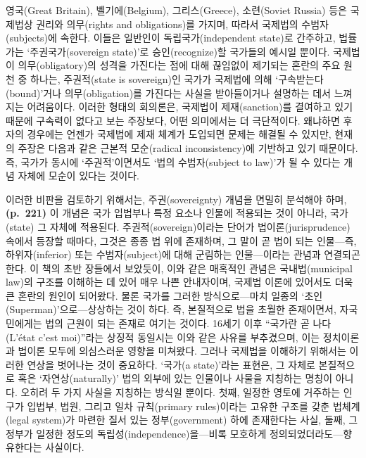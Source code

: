 영국(Great Britain), 벨기에(Belgium), 그리스(Greece), 소련(Soviet
Russia) 등은 국제법상 권리와 의무(rights and obligations)를 가지며,
따라서 국제법의 수범자(subjects)에 속한다. 이들은 일반인이
독립국가(independent state)로 간주하고, 법률가는 `주권국가(sovereign
state)'로 승인(recognize)할 국가들의 예시일 뿐이다. 국제법이
의무(obligatory)의 성격을 가진다는 점에 대해 끊임없이 제기되는 혼란의
주요 원천 중 하나는, 주권적(state is sovereign)인 국가가 국제법에 의해
`구속받는다(bound)'거나 의무(obligation)를 가진다는 사실을 받아들이거나
설명하는 데서 느껴지는 어려움이다. 이러한 형태의 회의론은, 국제법이
제재(sanction)를 결여하고 있기 때문에 구속력이 없다고 보는 주장보다,
어떤 의미에서는 더 극단적이다. 왜냐하면 후자의 경우에는 언젠가 국제법에
제재 체계가 도입되면 문제는 해결될 수 있지만, 현재의 주장은 다음과 같은
근본적 모순(radical inconsistency)에 기반하고 있기 때문이다. 즉, 국가가
동시에 `주권적'이면서도 `법의 수범자(subject to law)'가 될 수 있다는
개념 자체에 모순이 있다는 것이다.

이러한 비판을 검토하기 위해서는, 주권(sovereignty) 개념을 면밀히
분석해야 하며, \textbf{(p.~221)} 이 개념은 국가 
입법부나 특정 요소나 인물에 적용되는 것이 아니라, 국가(state) 그 자체에
적용된다. 주권적(sovereign)이라는 단어가 법이론(jurisprudence) 속에서
등장할 때마다, 그것은 종종 법 위에 존재하며, 그 말이 곧 법이 되는
인물---즉, 하위자(inferior) 또는 수범자(subject)에 대해 군림하는
인물---이라는 관념과 연결되곤 한다. 이 책의 초반 장들에서 보았듯이, 이와
같은 매혹적인 관념은 국내법(municipal law)의 구조를 이해하는 데 있어
매우 나쁜 안내자이며, 국제법 이론에 있어서도 더욱 큰 혼란의 원인이
되어왔다. 물론 국가를 그러한 방식으로---마치 일종의
`초인(Superman)'으로---상상하는 것이  하다. 즉,
본질적으로 법을 초월한 존재이면서, 자국민에게는 법의 근원이 되는 존재로
여기는 것이다. 16세기 이후 ``국가란 곧 나다(L'état c'est moi)''라는
상징적 동일시는 이와 같은 사유를 부추겼으며, 이는 정치이론과 법이론
모두에 의심스러운 영향을 미쳐왔다. 그러나 국제법을 이해하기 위해서는
이러한 연상을 벗어나는 것이 중요하다. `국가(a state)'라는 표현은, 그
자체로 본질적으로 혹은 `자연상(naturally)' 법의 외부에 있는 인물이나
사물을 지칭하는 명칭이 아니다. 오히려 두 가지 사실을 지칭하는 방식일
뿐이다. 첫째, 일정한 영토에 거주하는 인구가 입법부, 법원, 그리고 일차
규칙(primary rules)이라는 고유한 구조를 갖춘 법체계(legal system)가
마련한 질서 있는 정부(government) 하에 존재한다는 사실, 둘째, 그 정부가
일정한 정도의 독립성(independence)을---비록 모호하게
정의되었더라도---향유한다는 사실이다.

